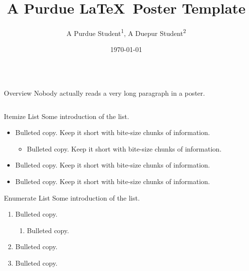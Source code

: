 \documentclass{purdue-poster}
\title{\Huge{A Purdue \LaTeX\ Poster Template}}
\author{\Large{A Purdue Student\texorpdfstring{\textsuperscript{1}}{}, A Duepur Student\texorpdfstring{\textsuperscript{2}}{}}}
\institute
{\large{Purdue University\texorpdfstring{\textsuperscript{1}}{}, Duepur University\texorpdfstring{\textsuperscript{2}},\\
Appearing at Overleaf Template}}
\date{\today}
\newlength{\postercolsep}
\newcommand{\postercolwidth}[1]{\dimeval{#1-\postercolsep}}
\begin{document}
\begin{frame}{}
\nointerlineskip
\begin{columns}[onlytextwidth, t]
    \begin{column}{\postercolwidth{.6\linewidth}}

        \begin{abstractblock}{Overview}
            Nobody actually reads a very long paragraph in a poster.

            \bigskip

            \lipsum[2]
        \end{abstractblock}

        \begin{columns}[onlytextwidth, t]
        
            \begin{column}{\postercolwidth{.5\linewidth}}
                
                \begin{plainblock}{Itemize List}
                    Some introduction of the list.
                    \begin{itemize}
                        \item Bulleted copy. Keep it short with bite-size chunks of information.
                        \begin{itemize}
                            \item Bulleted copy. Keep it short with bite-size chunks of information.
                        \end{itemize}
                        \item Bulleted copy. Keep it short with bite-size chunks of information.
                        \item Bulleted copy. Keep it short with bite-size chunks of information.
                    \end{itemize}
                \end{plainblock}
            
                \begin{plainblock}{Enumerate List}
                    Some introduction of the list.
                    \begin{enumerate}
                        \item Bulleted copy.
                        \begin{enumerate}
                            \item Bulleted copy.
                        \end{enumerate}
                        \item Bulleted copy.
                        \item Bulleted copy.
                    \end{enumerate}
                \end{plainblock}


\end{column}
\end{columns}
\end{column}
\end{columns}
\end{frame}
\end{document}

